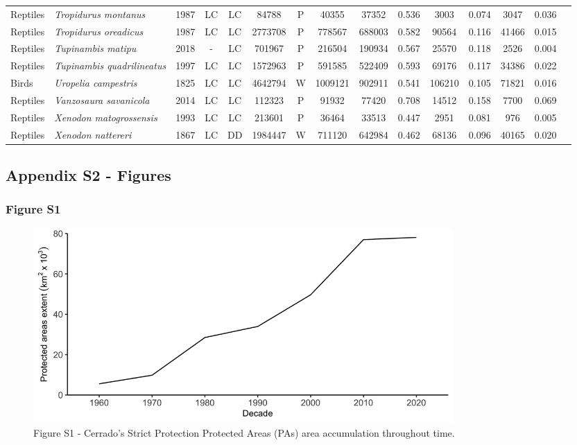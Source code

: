 \documentclass[12pt,openright,oneside,a4paper,english]{abntex2}
\begin{document}
\begin{landscape}
\begin{longtable}{llccccccccccccc}
		Reptiles&\textit{Tropidurus montanus}&1987&LC&LC&84788&P&40355&37352&0.536&3003&0.074&3047&0.036\\
		Reptiles&\textit{Tropidurus oreadicus}&1987&LC&LC&2773708&P&778567&688003&0.582&90564&0.116&41466&0.015\\
		Reptiles&\textit{Tupinambis matipu}&2018&-&LC&701967&P&216504&190934&0.567&25570&0.118&2526&0.004\\
		Reptiles&\textit{Tupinambis quadrilineatus}&1997&LC&LC&1572963&P&591585&522409&0.593&69176&0.117&34386&0.022\\
		Birds&\textit{Uropelia campestris}&1825&LC&LC&4642794&W&1009121&902911&0.541&106210&0.105&71821&0.016\\
		Reptiles&\textit{Vanzosaura savanicola}&2014&LC&LC&112323&P&91932&77420&0.708&14512&0.158&7700&0.069\\
		Reptiles&\textit{Xenodon matogrossensis}&1993&LC&LC&213601&P&36464&33513&0.447&2951&0.081&976&0.005\\
		Reptiles&\textit{Xenodon nattereri}&1867&LC&DD&1984447&W&711120&642984&0.462&68136&0.096&40165&0.020\\
	\end{longtable}

	\addtocounter{table}{-1}
	
\end{landscape}

\pagebreak

\subsection*{Appendix S2 - Figures}\label{sup:1-s2}

\subsubsection*{Figure S1}\label{fig:fig1-s1}
\begin{figure}[H]
	\centering
	\includegraphics[width=160mm]{Fig c1-s1}
	\caption*{\small Figure S1 - Cerrado’s Strict Protection Protected Areas (PAs) area accumulation throughout time.}
\end{figure}
\end{document}
